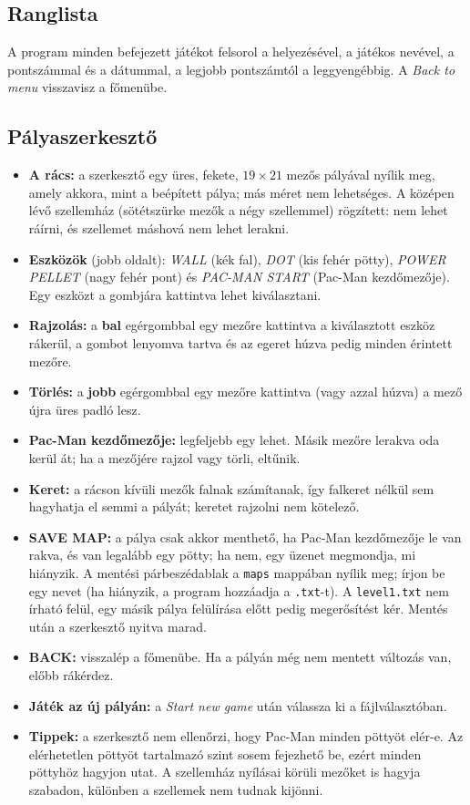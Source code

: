 \documentclass[11pt, a4paper]{article}
\begin{document}
\subsection*{Ranglista}
A program minden befejezett játékot felsorol a helyezésével, a játékos nevével, a pontszámmal és a dátummal, a legjobb pontszámtól a leggyengébbig. A \textit{Back to menu} visszavisz a főmenübe.

\subsection*{Pályaszerkesztő}
\begin{itemize}
    \item \textbf{A rács:} a szerkesztő egy üres, fekete, $19 \times 21$ mezős pályával nyílik meg, amely akkora, mint a beépített pálya; más méret nem lehetséges. A középen lévő szellemház (sötétszürke mezők a négy szellemmel) rögzített: nem lehet ráírni, és szellemet máshová nem lehet lerakni.
    \item \textbf{Eszközök} (jobb oldalt): \textit{WALL} (kék fal), \textit{DOT} (kis fehér pötty), \textit{POWER PELLET} (nagy fehér pont) és \textit{PAC-MAN START} (Pac-Man kezdőmezője). Egy eszközt a gombjára kattintva lehet kiválasztani.
    \item \textbf{Rajzolás:} a \textbf{bal} egérgombbal egy mezőre kattintva a kiválasztott eszköz rákerül, a gombot lenyomva tartva és az egeret húzva pedig minden érintett mezőre.
    \item \textbf{Törlés:} a \textbf{jobb} egérgombbal egy mezőre kattintva (vagy azzal húzva) a mező újra üres padló lesz.
    \item \textbf{Pac-Man kezdőmezője:} legfeljebb egy lehet. Másik mezőre lerakva oda kerül át; ha a mezőjére rajzol vagy törli, eltűnik.
    \item \textbf{Keret:} a rácson kívüli mezők falnak számítanak, így falkeret nélkül sem hagyhatja el semmi a pályát; keretet rajzolni nem kötelező.
    \item \textbf{SAVE MAP:} a pálya csak akkor menthető, ha Pac-Man kezdőmezője le van rakva, és van legalább egy pötty; ha nem, egy üzenet megmondja, mi hiányzik. A mentési párbeszédablak a \texttt{maps} mappában nyílik meg; írjon be egy nevet (ha hiányzik, a program hozzáadja a \texttt{.txt}-t). A \texttt{level1.txt} nem írható felül, egy másik pálya felülírása előtt pedig megerősítést kér. Mentés után a szerkesztő nyitva marad.
    \item \textbf{BACK:} visszalép a főmenübe. Ha a pályán még nem mentett változás van, előbb rákérdez.
    \item \textbf{Játék az új pályán:} a \textit{Start new game} után válassza ki a fájlválasztóban.
    \item \textbf{Tippek:} a szerkesztő nem ellenőrzi, hogy Pac-Man minden pöttyöt elér-e. Az elérhetetlen pöttyöt tartalmazó szint sosem fejezhető be, ezért minden pöttyhöz hagyjon utat. A szellemház nyílásai körüli mezőket is hagyja szabadon, különben a szellemek nem tudnak kijönni.
\end{itemize}
\end{document}
